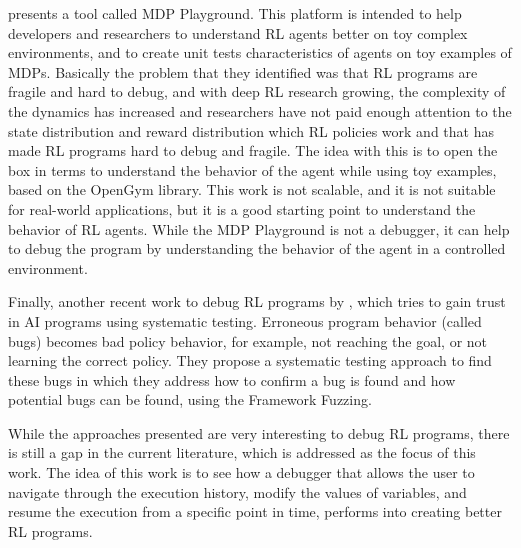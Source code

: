 \citet{Rajan_2023} presents a tool 
called \ac{MDP} Playground. This platform is intended to help developers and researchers to understand
\ac{RL} agents better on toy complex environments, and to create unit tests characteristics of agents 
on toy examples of \ac{MDP}s. Basically the problem that they identified was that \ac{RL} programs 
are fragile and hard to debug, and with deep \ac{RL} research growing, the complexity of the 
dynamics has increased and researchers have not paid enough attention to the state distribution and 
reward distribution which \ac{RL} policies work and that has made \ac{RL} programs hard to debug 
and fragile\cite{Rajan_2023}. The idea with this is to open the box in terms to understand the behavior of the agent 
while using toy examples, based on the OpenGym library. This work is not scalable, and it is not 
suitable for real-world applications, but it is a good starting point to understand the behavior of 
\ac{RL} agents. While the \ac{MDP} Playground is not a debugger, it can help to debug the program by understanding the 
behavior of the agent in a controlled environment.

Finally, another recent work to debug \ac{RL} programs by \citet{Steinmetz2021DebuggingAP},
which tries to gain trust in \ac{AI} programs using systematic testing. Erroneous program behavior
(called bugs) becomes bad policy behavior, for example, not reaching the 
goal, or not learning the correct policy. They propose a systematic testing approach to find these 
bugs in which they address how to confirm a bug is found and how potential bugs can be found, 
using the Framework Fuzzing\cite{Steinmetz2021DebuggingAP}.

While the approaches presented are very interesting to debug \ac{RL} programs, there is still
a gap in the current literature, which is addressed as the focus of this work. The idea 
of this work is to see how 
a debugger that allows the user to navigate through the execution history, modify the values of 
variables, and resume the execution from a specific point in time, performs into creating
better \ac{RL} programs.

\endinput

